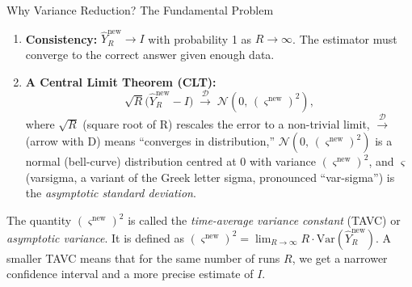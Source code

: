\documentclass[aspectratio=169,10pt]{beamer}
\begin{document}
\begin{frame}[allowframebreaks]{Why Variance Reduction? The Fundamental Problem}
\begin{enumerate}
  \item \textbf{Consistency:} $\hat{Y}_R^{\mathrm{new}} \to I$ with probability 1
        as $R \to \infty$.  The estimator must converge to the correct answer
        given enough data.
  \item \textbf{A Central Limit Theorem (CLT):}
        \[
          \sqrt{R}\bigl(\hat{Y}_R^{\mathrm{new}} - I\bigr)
          \;\xrightarrow{\mathcal{D}}\; \mathcal{N}(0,\,(\varsigma^{\mathrm{new}})^2),
        \]
        where $\sqrt{R}$ (square root of R) rescales the error to a non-trivial
        limit, $\xrightarrow{\mathcal{D}}$ (arrow with D) means ``converges in
        distribution,'' $\mathcal{N}(0,\,(\varsigma^{\mathrm{new}})^2)$ is a normal
        (bell-curve) distribution centred at 0 with variance $(\varsigma^{\mathrm{new}})^2$,
        and $\varsigma$ (varsigma, a variant of the Greek letter sigma, pronounced
        ``var-sigma'') is the \emph{asymptotic standard deviation}.
\end{enumerate}

The quantity $(\varsigma^{\mathrm{new}})^2$ is called the
\emph{time-average variance constant} (TAVC) or \emph{asymptotic variance}.
It is defined as $(\varsigma^{\mathrm{new}})^2 = \lim_{R\to\infty} R \cdot \mathrm{Var}(\hat{Y}_R^{\mathrm{new}})$.
A smaller TAVC means that for the same number of runs $R$, we get a
narrower confidence interval and a more precise estimate of $I$.

\framebreak


\end{frame}
\end{document}
